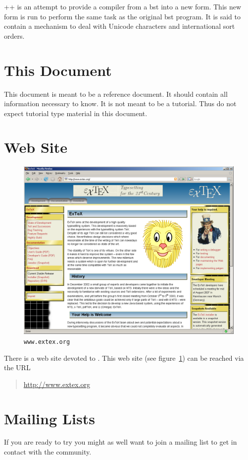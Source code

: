 \BibTeX++ \cite{sastre.ea:bibtex++} is an
attempt to provide a compiler from a bst into a new form. This new
form is run to perform the same task as the original bst program. It
is said to contain a mechanism to deal with Unicode characters and
international sort orders.


\INCOMPLETE

\cite{widmann:bibulus}


\section{This Document}

This document is meant to be a reference document. It should contain
all information necessary to know. It is not meant to be a tutorial.
Thus do not expect tutorial type material in this document.


\section{Web Site}%

\begin{figure}[!ht]
  \centering
  \includegraphics[width=.5\textwidth]{img/www-extex-org}
  \caption{\texttt{www.extex.org}}
  \label{fig:www.exetex.org}
\end{figure}
There is a web site devoted to \ExTeX. This
web site (see figure~\ref{fig:www.exetex.org}) can be reached via the
URL
\begin{quotation}
  \url{http://www.extex.org}
\end{quotation}


\section{Mailing Lists}

If you are ready to try \ExBib{} you might as well want to join a
mailing list to get in contact with the community.

